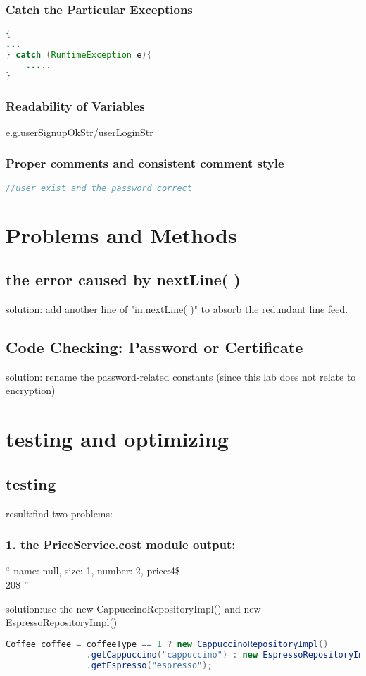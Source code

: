 \documentclass[./report.tex]{subfiles}
\begin{document}
  \subsubsection{Catch the Particular Exceptions }
  \begin{lstlisting}[language=java]
{
...
} catch (RuntimeException e){
	.....
}
\end{lstlisting}
  
    \subsubsection{Readability of Variables}
    \par e.g.userSignupOkStr/userLoginStr
    
 \subsubsection{Proper comments and consistent comment style}
   \begin{lstlisting}[language=java]
//user exist and the password correct
\end{lstlisting}   
\section{Problems and Methods}
    \subsection{the error caused by nextLine( )}
    \par solution: add another line of "in.nextLine( )" to absorb the redundant line feed.
    \subsection{Code Checking: Password or Certificate }
    \par solution: rename the password-related constants (since this lab does not relate to encryption)


\section{testing and optimizing}
	\subsection{testing}
	\par result:find two problems: 
		\subsubsection{1. the PriceService.cost module output:}
		\par `` name: null, size: 1, number: 2, price:4\$ \\ 20\$  ''
		\par 	solution:use the new CappuccinoRepositoryImpl() and new EspressoRepositoryImpl()
		\par
  \begin{lstlisting}[language=java]
Coffee coffee = coffeeType == 1 ? new CappuccinoRepositoryImpl()
                .getCappuccino("cappuccino") : new EspressoRepositoryImpl()
                .getEspresso("espresso");
\end{lstlisting}
\end{document}
